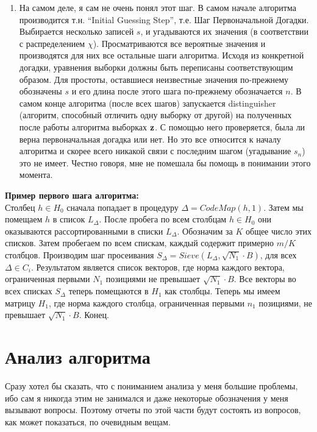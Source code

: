 \documentclass[a4paper,11pt]{article}
\begin{document}
\begin{enumerate}
\item 	На самом деле, я сам не очень понял этот шаг. В самом начале алгоритма производится т.н. “Initial Guessing Step”, т.е. Шаг Первоначальной Догадки. Выбирается несколько записей $s$, и угадываются их значения (в соответствии с распределением $\chi$). Просматриваются все вероятные значения и производятся для них все остальные шаги алгоритма. Исходя из конкретной догадки, уравнения выборки должны быть переписаны соответствующим образом. Для простоты, оставшиеся неизвестные значения по-прежнему обозначены $s$ и его длина после этого шага по-прежнему обозначается $n$. В самом конце алгоритма (после всех шагов) запускается distinguisher (алгоритм, способный отличить одну выборку от другой) на полученных после работы алгоритма выборках $\mathbf{z}$. С помощью него проверяется, была ли верна первоначальная догадка или нет. Но это все относится к началу алгоритма и скорее всего никакой связи с последним шагом (угадывание $s_n$) это не имеет. Честно говоря, мне не помешала бы помощь в понимании этого момента.
\end{enumerate}

\textbf{Пример первого шага алгоритма:}\\
Столбец $h \in H_0$ сначала попадает в процедуру $\Delta=CodeMap(h,1)$. Затем мы помещаем $h$ в список $L_{\Delta}$. После пробега по всем столбцам $h \in H_0$ они оказываются рассортированными в списки $L_{\Delta}$. Обозначим за $K$ общее число этих списков. Затем пробегаем по всем спискам, каждый содержит примерно $m/K$ столбцов. Производим шаг просеивания  $S_{\Delta} = Sieve(L_{\Delta}, \sqrt{N_1}\cdot B)$, для всех $\Delta \in C_i$. Результатом является список векторов, где норма каждого вектора, ограниченная первыми $N_1$ позициями не превышает $\sqrt{N_1}\cdot B$. Все векторы во всех списках $S_{\Delta}$ теперь помещаются в $H_1$ как столбцы. Теперь мы имеем матрицу $H_1$, где норма каждого столбца, ограниченная первыми $n_1$ позициями, не превышает $\sqrt{N_1}\cdot B$. Конец.

\section{Анализ алгоритма}

Сразу хотел бы сказать, что с пониманием анализа у меня большие проблемы, ибо сам я никогда этим не занимался и даже некоторые обозначения у меня вызывают вопросы. Поэтому отчеты по этой части будут состоять из вопросов, как может показаться, по очевидным вещам.
\end{document}
